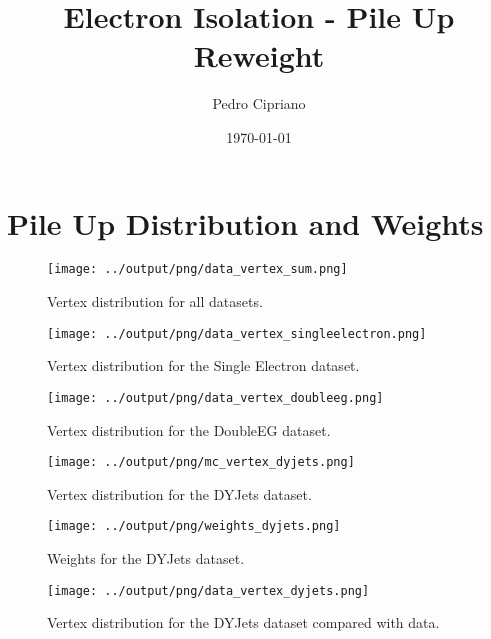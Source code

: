 \documentclass[11pt]{book}
\begin{document}
         
 
 \author{Pedro Cipriano}
 \date{\today}
 \title{Electron Isolation - Pile Up Reweight}

\maketitle

\tableofcontents

\chapter{Pile Up Distribution and Weights}
\begin{figure}[htb]
\centering
\texttt{[image: ../output/png/data\_vertex\_sum.png]}
\caption{Vertex distribution for all datasets.}
\label{fig:data_vertex_sum}
\end{figure}


\begin{figure}[htb]
\centering
\texttt{[image: ../output/png/data\_vertex\_singleelectron.png]}
\caption{Vertex distribution for the Single Electron dataset.}
\label{fig:data_vertex_singleelectron}
\end{figure}

\begin{figure}[htb]
\centering
\texttt{[image: ../output/png/data\_vertex\_doubleeg.png]}
\caption{Vertex distribution for the DoubleEG dataset.}
\label{fig:data_vertex_doubleeg}
\end{figure}

\begin{figure}[htb]
\centering
\texttt{[image: ../output/png/mc\_vertex\_dyjets.png]}
\caption{Vertex distribution for the DYJets dataset.}
\label{fig:mc_vertex_dyjets}
\end{figure}

\begin{figure}[htb]
\centering
\texttt{[image: ../output/png/weights\_dyjets.png]}
\caption{Weights for the DYJets dataset.}
\label{fig:weight_dyjets}
\end{figure}

\begin{figure}[htb]
\centering
\texttt{[image: ../output/png/data\_vertex\_dyjets.png]}
\caption{Vertex distribution for the DYJets dataset compared with data.}
\label{fig:data_vertex_dyjets}
\end{figure}
\end{document}
